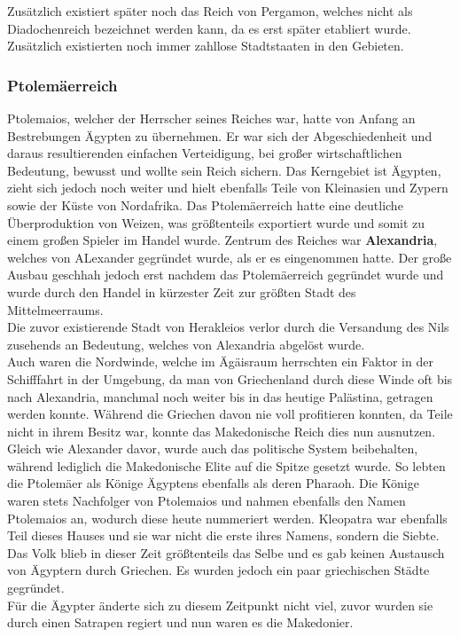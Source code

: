 \documentclass{article}
\begin{document}
	Zusätzlich existiert später noch das Reich von Pergamon, welches nicht als Diadochenreich bezeichnet werden kann, da es erst später etabliert wurde. Zusätzlich existierten noch immer zahllose Stadtstaaten in den Gebieten.
	\subsubsection{Ptolemäerreich}
	Ptolemaios, welcher der Herrscher seines Reiches war, hatte von Anfang an Bestrebungen Ägypten zu übernehmen. Er war sich der Abgeschiedenheit und daraus resultierenden einfachen Verteidigung, bei großer wirtschaftlichen Bedeutung, bewusst und wollte sein Reich sichern. Das Kerngebiet ist Ägypten, zieht sich jedoch noch weiter und hielt ebenfalls Teile von Kleinasien und Zypern sowie der Küste von Nordafrika. Das Ptolemäerreich hatte eine deutliche Überproduktion von Weizen, was größtenteils exportiert wurde und somit zu einem großen Spieler im Handel wurde. Zentrum des Reiches war \textbf{Alexandria}, welches von ALexander gegründet wurde, als er es eingenommen hatte. Der große Ausbau geschhah jedoch erst nachdem das Ptolemäerreich gegründet wurde und wurde durch den Handel in kürzester Zeit zur größten Stadt des Mittelmeerraums. \\
	Die zuvor existierende Stadt von Herakleios verlor durch die Versandung des Nils zusehends an Bedeutung, welches von Alexandria abgelöst wurde. \\
	Auch waren die Nordwinde, welche im Ägäisraum herrschten ein Faktor in der Schifffahrt in der Umgebung, da man von Griechenland durch diese Winde oft bis nach Alexandria, manchmal noch weiter bis in das heutige Palästina, getragen werden konnte. Während die Griechen davon nie voll profitieren konnten, da Teile nicht in ihrem Besitz war, konnte das Makedonische Reich dies nun ausnutzen. Gleich wie Alexander davor, wurde auch das politische System beibehalten, während lediglich die Makedonische Elite auf die Spitze gesetzt wurde. So lebten die Ptolemäer als Könige Ägyptens ebenfalls als deren Pharaoh. Die Könige waren stets Nachfolger von Ptolemaios und nahmen ebenfalls den Namen Ptolemaios an, wodurch diese heute nummeriert werden. Kleopatra war ebenfalls Teil dieses Hauses und sie war nicht die erste ihres Namens, sondern die Siebte. \\
	Das Volk blieb in dieser Zeit größtenteils das Selbe und es gab keinen Austausch von Ägyptern durch Griechen. Es wurden jedoch ein paar griechischen Städte gegründet. \\
	Für die Ägypter änderte sich zu diesem Zeitpunkt nicht viel, zuvor wurden sie durch einen Satrapen regiert und nun waren es die Makedonier. \\
\end{document}
